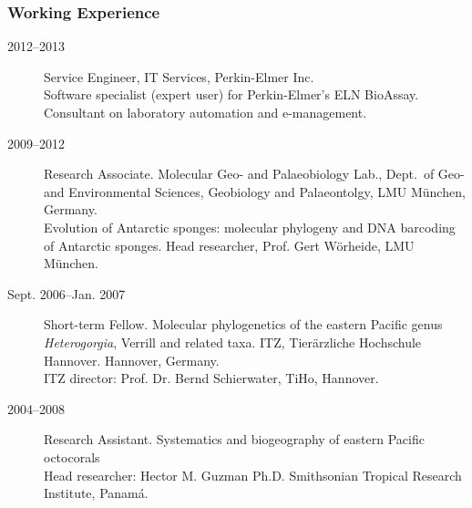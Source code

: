 \documentclass[letter,10pt]{article}
\begin{document}
\subsubsection*{Working Experience}
\begin{description}
\item [2012--2013] Service Engineer, IT Services, Perkin-Elmer Inc.\\Software specialist (expert user) for Perkin-Elmer's ELN BioAssay. Consultant on laboratory automation and e-management.

\item[2009--2012] Research Associate. Molecular Geo- and Palaeobiology Lab., Dept.~of Geo- and Environmental Sciences, Geobiology and Palaeontolgy, LMU M\"unchen, Germany.\\ Evolution of Antarctic sponges: molecular phylogeny and DNA barcoding of Antarctic sponges.
Head researcher, Prof. Gert W\"orheide, LMU M\"unchen.

\item[Sept. 2006--Jan. 2007] Short-term Fellow. Molecular phylogenetics of the eastern Pacific genus \emph{Heterogorgia}, Verrill and related taxa. ITZ, Tier\"arzliche Hochschule Hannover. Hannover, Germany.\\
ITZ director: Prof. Dr. Bernd Schierwater, TiHo, Hannover.

\item[2004--2008] Research Assistant. Systematics and biogeography of eastern Pacific octocorals\\
Head researcher: Hector M. Guzman Ph.D. Smithsonian Tropical Research Institute, Panam\'a.




\end{description}
\end{document}
